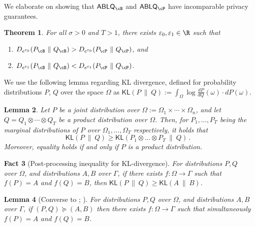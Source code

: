 \documentclass[twoside]{article}
\newtheorem{theorem}{Theorem}[section]
\newtheorem{lemma}[theorem]{Lemma}
\newtheorem{fact}[theorem]{Fact}
\theoremstyle{definition}
\newcommand{\eps}{\varepsilon}
\newcommand{\KL}{\mathsf{KL}}
\newcommand{\ABLQ}{\mathsf{ABLQ}}
\newcommand{\ABLQP}{\ABLQ_{\cP}}
\newcommand{\ABLQB}{\ABLQ_{\cB}}
\newcommand{\PB}{P_{\cB}}
\newcommand{\QB}{Q_{\cB}}
\newcommand{\PP}{P_{\cP}}
\newcommand{\QP}{Q_{\cP}}
\newcommand{\dominates}{\succcurlyeq}%
\begin{document}
We elaborate on  showing that $\ABLQB$ and $\ABLQP$ have incomparable privacy guarantees.

\begin{theorem}\label{thm:bnb-vs-poisson-2}
For all $\sigma > 0$ and $T > 1$, there exists $\eps_0, \eps_1 \in \R$ such that
\begin{enumerate}[label=(\alph*),topsep=0pt,itemsep=0pt]
\item $D_{e^{\eps_0}}(\PB ~\|~ \QB) > D_{e^{\eps_0}}(\PP ~\|~ \QP)$, and
\item $D_{e^{\eps_1}}(\PB ~\|~ \QB) < D_{e^{\eps_1}}(\PP ~\|~ \QP)$.
\end{enumerate}
\end{theorem}

We use the following lemma regarding KL divergence, defined for probability distributions $P$, $Q$ over the space $\Omega$ as $\KL(P ~\|~ Q) := \int_{\Omega} \log \frac{dP}{dQ}(\omega) \cdot dP(\omega)$.
\begin{lemma}\label{lem:kl-inequality}
Let $P$ be a joint distribution over $\Omega := \Omega_1 \times \cdots \times \Omega_n$, and let $Q = Q_1 \otimes \cdots \otimes Q_T$ be a product distribution over $\Omega$. Then, for $P_1, \ldots, P_T$ being the marginal distributions of $P$ over $\Omega_1, \ldots, \Omega_T$ respectively, it holds that
$$\KL(P ~\|~ Q) \ge \KL(P_1 \otimes \dots \otimes P_T ~\|~ Q)\,.$$
Moreover, equality holds if and only if $P$ is a product distribution.
\end{lemma}

\begin{fact}[Post-processing inequality for KL-divergence]\label{fact:kl-post-processing}
For distributions $P, Q$ over $\Omega$, and distributions $A, B$ over $\Gamma$, if there exists $f : \Omega \to \Gamma$ such that $f(P) = A$ and $f(Q) = B$, then $\KL(P ~\|~ Q) \ge \KL(A ~\|~ B)$.
\end{fact}

\begin{lemma}[{Converse to ; \cite[Theorem 2.5]{kairouz15composition}}]\label{lem:converse-post-process-and-domination}
For distributions $P, Q$ over $\Omega$, and distributions $A, B$ over $\Gamma$, if $(P, Q) \dominates (A, B)$ then there exists $f : \Omega \to \Gamma$ such that simultaneously $f(P) = A$ and $f(Q) = B$.
\end{lemma}
\end{document}
